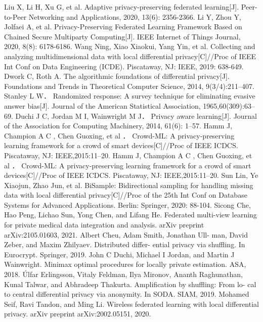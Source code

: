 \documentclass[12pt,openany,a4paper,fancyhdr,oneside]{ctexbook}
\begin{document}
\begin{thebibliography}{99}
Liu X, Li H, Xu G, et al. Adaptive privacy-preserving federated learning[J]. Peer-to-Peer Networking and Applications, 2020, 13(6): 2356-2366.
Li Y, Zhou Y, Jolfaei A, et al. Privacy-Preserving Federated Learning Framework Based on Chained Secure Multiparty Computing[J]. IEEE Internet of Things Journal, 2020, 8(8): 6178-6186.
Wang  Ning,  Xiao  Xiaokui,  Yang  Yin,  et  al.  Collecting  and  analyzing 
multidimensional data with local differential privacy[C]//Proc of IEEE Int 
Conf on Data Engineering (ICDE). Piscataway, NJ: IEEE, 2019: 638-649.
 Dwork  C,  Roth  A.  The  algorithmic  foundations  of  differential  privacy[J]. 
Foundations  and  Trends  in  Theoretical  Computer  Science,  2014, 
9(3/4):211–407.
 Stanley L W．  Randomized response: A survey technique for eliminating 
evasive  answer  bias[J].  Journal  of  the  American  Statistical  Association, 
1965,60(309):63–69.
Duchi  J  C,  Jordan  M  I,  Wainwright  M  J．  Privacy  aware  learning[J]. 
Journal of the Association for Computing Machinery, 2014, 61(6): 1–57.
Hamm  J,  Champion  A  C  ,  Chen  Guoxing,  et  al ．   Crowd-ML:  A 
privacy-preserving  learning  framework  for  a  crowd  of  smart 
devices[C]//Proc of IEEE ICDCS. Piscataway, NJ: IEEE,2015:11–20.
  Hamm  J,  Champion  A  C  ,  Chen  Guoxing,  et  al ．   Crowd-ML:  A 
privacy-preserving  learning  framework  for  a  crowd  of  smart 
devices[C]//Proc of IEEE ICDCS. Piscataway, NJ: IEEE,2015:11–20.
 Sun Lin, Ye Xiaojun, Zhao Jun, et al. BiSample: Bidirectional sampling for 
handling  missing  data  with  local  differential  privacy[C]//Proc  of  the  25th 
Int Conf on Database Systems for Advanced Applications. Berlin: Springer, 
2020: 88-104.
Sicong Che, Hao Peng, Lichao Sun, Yong Chen, and Lifang He. Federated multi-view learning for private medical data integration and analysis. arXiv preprint arXiv:2105.01603, 2021.
Albert Cheu, Adam Smith, Jonathan Ull- man, David Zeber, and Maxim Zhilyaev. Distributed differ- ential privacy via shuffling. In Eurocrypt. Springer, 2019.
John C Duchi, Michael I Jordan, and Martin J Wainwright. Minimax optimal procedures for locally private estimation. ASA, 2018.
Úlfar Erlingsson, Vitaly Feldman, Ilya Mironov, Ananth Raghunathan, Kunal Talwar, and Abhradeep Thakurta. Amplification by shuffling: From lo- cal to central differential privacy via anonymity. In SODA. SIAM, 2019.
Mohamed Seif, Ravi Tandon, and Ming Li. Wireless federated learning with local differential privacy. arXiv preprint arXiv:2002.05151, 2020.

\end{thebibliography}
\end{document}
